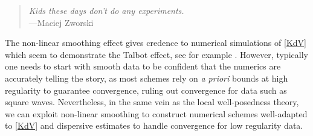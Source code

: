 \begin{flushright}
    \begin{quote}
        {\hfill\it Kids these days don't do any experiments.}\\
        \hfill ---Maciej Zworski
    \end{quote}    
\end{flushright}

The non-linear smoothing effect gives credence to numerical simulations of \eqref{KdV} which seem to demonstrate the Talbot effect, see for example \cite{ChenOlver2013}. However, typically one needs to start with smooth data to be confident that the numerics are accurately telling the story, as most schemes rely on \textit{a priori} bounds at high regularity to guarantee convergence, ruling out convergence for data such as square waves. Nevertheless, in the same vein as the local well-posedness theory, we can exploit non-linear smoothing to construct numerical schemes well-adapted to \eqref{KdV} and dispersive estimates to handle convergence for low regularity data. 

